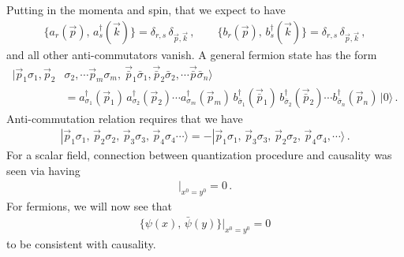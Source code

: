 \documentclass[11pt, onesided]{book}
\theoremstyle{break}
\theoremstyle{break}
\begin{document}
Putting in the momenta and spin, that we expect to have
\begin{align*}
\{a_r(\vec{p}), \, a_s^\dagger(\vec{k}) \} = \delta_{r,s}\, \delta_{\vec{p},\vec{k}}\,,\qquad
\{b_r(\vec{p}), \, b_s^\dagger(\vec{k}) \} = \delta_{r,s}\, \delta_{\vec{p},\vec{k}}\,,
\end{align*}
and all other anti-commutators vanish. A general fermion state has the form
\begin{align*}
|\vec{p}_1\sigma_1,\vec{p}_2&\sigma_2,\cdots \vec{p}_m \sigma_m,\ \vec{\bar{p}}_1\bar{\sigma}_1,\vec{\bar{p}}_2\bar{\sigma}_2,\cdots \vec{\bar{p}}\bar{\sigma}_n\rangle \\
&= a_{\sigma_1}^\dagger(\vec{p}_1)\,a_{\sigma_2}^\dagger(\vec{p}_2) \cdots a_{\sigma_m}^\dagger(\vec{p}_m) \, b_{\bar{\sigma}_1}^\dagger(\vec{\bar{p}}_1)\,  b_{\bar{\sigma}_2}^\dagger(\vec{\bar{p}}_2)\cdots b_{\bar{\sigma}_n}^\dagger(\vec{p}_n)\, |0\rangle\,.
\end{align*}
Anti-commutation relation requires that we have
\begin{align*}
|\vec{p}_1\sigma_1,\, \vec{p}_2\sigma_2,\, \vec{p}_3\sigma_3,\, \vec{p}_4\sigma_4 \cdots\rangle = -|\vec{p}_1 \sigma_1,\, \vec{p}_3 \sigma_3,\, \vec{p}_2\sigma_2,\, \vec{p}_4\sigma_4,\cdots\rangle\,.
\end{align*}
For a scalar field, connection between quantization procedure and causality was seen via having
\begin{align*}
[\phi(x),\, \phi(y)]|_{x^0 = y^0} = 0\,.
\end{align*}
For fermions, we will now see that 
\begin{align*}
\{\psi(x),\, \bar{\psi}(y) \}|_{x^0 = y^0} = 0
\end{align*}
to be consistent with causality. \\
\end{document}
